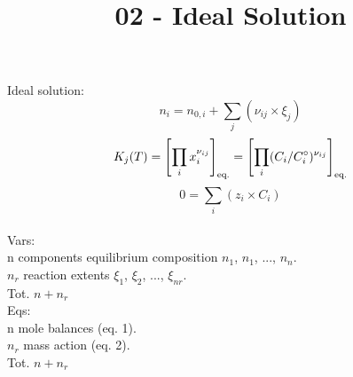 \documentclass[onecolumn]{article}
\begin{document}
\title{02 - Ideal Solution}
\author{}
\date{}
\maketitle
Ideal solution:
\begin{equation}
n_i = n_{0,i} + \sum_j(\nu_{ij} \times \xi_j)
\end{equation}
\begin{equation}
K_j(T) = \left[ \prod_ix_i^{\nu_{ij}} \right]_{\textnormal{eq.}}= 
\left[ \prod_i(C_i/C^{\circ}_i)^{\nu_{ij}} \right]_{\textnormal{eq.}}
\end{equation}
\begin{equation}
0 = \sum_i(z_i \times C_i)
\end{equation}
\\
Vars: \\
n components equilibrium composition $n_1$, $n_1$, ..., $n_n$. \\
$n_r$ reaction extents $\xi_1$, $\xi_2$, ..., $\xi_{nr}$. \\
Tot. $n + n_r$ \\
Eqs: \\
n mole balances (eq. 1). \\
$n_r$ mass action (eq. 2). \\
Tot. $n + n_r$
\end{document}
